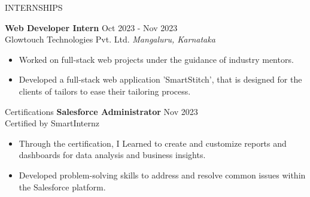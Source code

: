 \documentclass{resume} %
\begin{document}
\begin{rSection}{INTERNSHIPS}

\textbf{Web Developer Intern} \hfill Oct 2023 - Nov 2023\\
Glowtouch Technologies Pvt. Ltd. \hfill \textit{Mangaluru, Karnataka}
 \begin{itemize}
    \itemsep -3pt {} 
     \item Worked on full-stack web projects under the guidance of industry mentors.
    \item Developed a full-stack web application 'SmartStitch', that is designed for the clients of tailors to ease their tailoring process. 
 \end{itemize}
 


\end{rSection} 

\begin{rSection}{Certifications} 
    \textbf{Salesforce Administrator} \hfill Nov 2023\\
Certified by SmartInternz %
 \begin{itemize}
    \itemsep -3pt {} 
    \item Through the certification, I Learned to create and customize reports and dashboards for data analysis and business insights. 
     \item Developed problem-solving skills to address and resolve common issues within the Salesforce platform.
 \end{itemize}
    
    
    \end{rSection}
    
\end{document}
